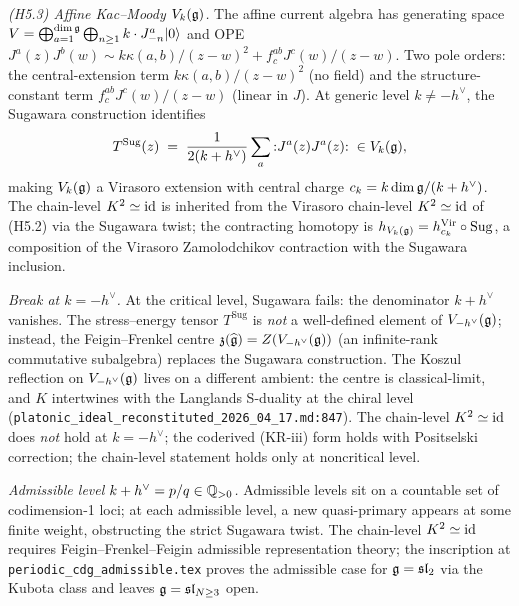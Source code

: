 \emph{(H5.3) Affine Kac--Moody $V_{k}(\mathfrak{g})$.} The affine current
algebra has generating space
$V = \bigoplus_{a=1}^{\dim\mathfrak{g}}\bigoplus_{n\geq 1}k\cdot J^{a}_{-n}|0\rangle$
and OPE
$J^{a}(z)J^{b}(w)\sim k\kappa(a,b)/(z-w)^{2} + f^{ab}_{c}J^{c}(w)/(z-w)$.
Two pole orders: the central-extension term
$k\kappa(a,b)/(z-w)^{2}$ (no field) and the structure-constant term
$f^{ab}_{c}J^{c}(w)/(z-w)$ (linear in $J$). At generic level
$k\neq -h^{\vee}$, the Sugawara construction identifies
\[
T^{\mathrm{Sug}}(z) \;=\; \frac{1}{2(k+h^{\vee})}\sum_{a}{:}J^{a}(z)J^{a}(z){:}\;\in V_{k}(\mathfrak{g}),
\]
making $V_{k}(\mathfrak{g})$ a Virasoro extension with central charge
$c_{k} = k\dim\mathfrak{g}/(k+h^{\vee})$. The chain-level
$K^{2}\simeq\mathrm{id}$ is inherited from the Virasoro chain-level
$K^{2}\simeq\mathrm{id}$ of (H5.2) via the Sugawara twist; the
contracting homotopy is
$h_{V_{k}(\mathfrak{g})} = h^{\mathrm{Vir}}_{c_{k}}\circ\mathrm{Sug}$,
a composition of the Virasoro Zamolodchikov contraction with the
Sugawara inclusion.

\emph{Break at $k = -h^{\vee}$.} At the critical level, Sugawara
fails: the denominator $k+h^{\vee}$ vanishes. The stress--energy
tensor $T^{\mathrm{Sug}}$ is \emph{not} a well-defined element of
$V_{-h^{\vee}}(\mathfrak{g})$; instead, the Feigin--Frenkel centre
$\mathfrak{z}(\widehat{\mathfrak{g}}) = Z(V_{-h^{\vee}}(\mathfrak{g}))$ (an infinite-rank
commutative subalgebra) replaces the Sugawara construction. The
Koszul reflection on $V_{-h^{\vee}}(\mathfrak{g})$ lives on a different
ambient: the centre is classical-limit, and $K$ intertwines with the
Langlands S-duality at the chiral level
(\texttt{platonic\_ideal\_reconstituted\_2026\_04\_17.md:847}).
The chain-level $K^{2}\simeq\mathrm{id}$ does \emph{not} hold at $k =
-h^{\vee}$; the coderived (KR-iii) form holds with Positselski
correction; the chain-level statement holds only at noncritical
level.

\emph{Admissible level $k + h^{\vee} = p/q\in\mathbb{Q}_{>0}$.} Admissible
levels sit on a countable set of codimension-1 loci; at each
admissible level, a new quasi-primary appears at some finite weight,
obstructing the strict Sugawara twist. The chain-level
$K^{2}\simeq\mathrm{id}$ requires Feigin--Frenkel--Feigin admissible
representation theory; the inscription at
\texttt{periodic\_cdg\_admissible.tex} proves the admissible case for
$\mathfrak{g} = \mathfrak{sl}_{2}$ via the Kubota class and leaves
$\mathfrak{g} = \mathfrak{sl}_{N\geq 3}$ open.

